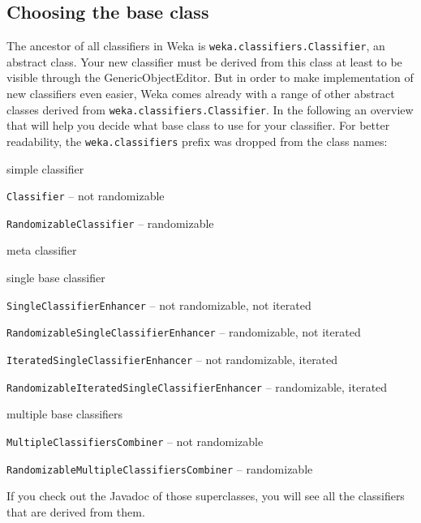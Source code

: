 \subsection{Choosing the base class}
The ancestor of all classifiers in Weka is \texttt{weka.classifiers.Classifier},
an abstract class. Your new classifier must be derived from this class at
least to be visible through the GenericObjectEditor. But in order to
make implementation of new classifiers even easier, Weka comes already with a
range of other abstract classes derived from
\texttt{weka.classifiers.Classifier}. In the following an overview that will
help you decide what base class to use for your classifier. For better
readability, the \texttt{weka.classifiers} prefix was dropped from the class
names:
\begin{tight_itemize}
  \item simple classifier
	\begin{tight_itemize}
	  \item \texttt{Classifier} -- not randomizable
	  \item \texttt{RandomizableClassifier} -- randomizable
	\end{tight_itemize}
  \item meta classifier
	\begin{tight_itemize}
	  \item single base classifier
		\begin{tight_itemize}
		  \item \texttt{SingleClassifierEnhancer} -- not randomizable, not
iterated
		  \item \texttt{RandomizableSingleClassifierEnhancer} -- randomizable,
not iterated
		  \item \texttt{IteratedSingleClassifierEnhancer} -- not randomizable,
iterated
		  \item \texttt{RandomizableIteratedSingleClassifierEnhancer} --
randomizable, iterated
		\end{tight_itemize}
	  \item multiple base classifiers
		\begin{tight_itemize}
		  \item \texttt{MultipleClassifiersCombiner} -- not randomizable
		  \item \texttt{RandomizableMultipleClassifiersCombiner} -- randomizable
		\end{tight_itemize}
	\end{tight_itemize}
\end{tight_itemize}
If you check out the Javadoc of those superclasses, you will see all the
classifiers that are derived from them.

